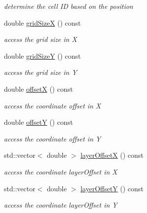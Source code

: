 \begin{DoxyCompactItemize}
\begin{DoxyCompactList}\small\item\em determine the cell ID based on the position \end{DoxyCompactList}\item 
double \hyperlink{class_d_d4hep_1_1_d_d_segmentation_1_1_tiled_layer_grid_x_y_aa38b5a15a0635685432d039eca235d99}{grid\+SizeX} () const
\begin{DoxyCompactList}\small\item\em access the grid size in X \end{DoxyCompactList}\item 
double \hyperlink{class_d_d4hep_1_1_d_d_segmentation_1_1_tiled_layer_grid_x_y_a6f66ec3fe4dc396a168cbc17df35935f}{grid\+SizeY} () const
\begin{DoxyCompactList}\small\item\em access the grid size in Y \end{DoxyCompactList}\item 
double \hyperlink{class_d_d4hep_1_1_d_d_segmentation_1_1_tiled_layer_grid_x_y_ab3a933ea8f4ae73a4cd0338a9db27532}{offsetX} () const
\begin{DoxyCompactList}\small\item\em access the coordinate offset in X \end{DoxyCompactList}\item 
double \hyperlink{class_d_d4hep_1_1_d_d_segmentation_1_1_tiled_layer_grid_x_y_a47313975940c28c394e6496f706ae0be}{offsetY} () const
\begin{DoxyCompactList}\small\item\em access the coordinate offset in Y \end{DoxyCompactList}\item 
std\+::vector$<$ double $>$ \hyperlink{class_d_d4hep_1_1_d_d_segmentation_1_1_tiled_layer_grid_x_y_ab799c0cf8e676a4849ca96eb8d0b2619}{layer\+OffsetX} () const
\begin{DoxyCompactList}\small\item\em access the coordinate layer\+Offset in X \end{DoxyCompactList}\item 
std\+::vector$<$ double $>$ \hyperlink{class_d_d4hep_1_1_d_d_segmentation_1_1_tiled_layer_grid_x_y_a61e4d16f23c1069f3b22c8a7838640f9}{layer\+OffsetY} () const
\begin{DoxyCompactList}\small\item\em access the coordinate layer\+Offset in Y \end{DoxyCompactList}\item 

\end{DoxyCompactItemize}
